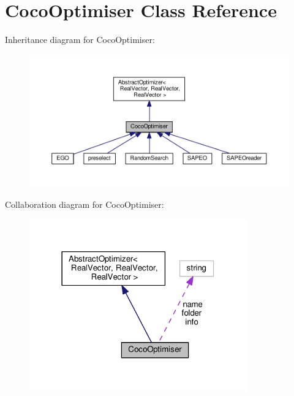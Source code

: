 \hypertarget{classCocoOptimiser}{}\section{Coco\+Optimiser Class Reference}
\label{classCocoOptimiser}


Inheritance diagram for Coco\+Optimiser\+:\nopagebreak
\begin{figure}[H]
\begin{center}
\leavevmode
\includegraphics[width=350pt]{classCocoOptimiser__inherit__graph}
\end{center}
\end{figure}


Collaboration diagram for Coco\+Optimiser\+:\nopagebreak
\begin{figure}[H]
\begin{center}
\leavevmode
\includegraphics[width=266pt]{classCocoOptimiser__coll__graph}
\end{center}
\end{figure}
